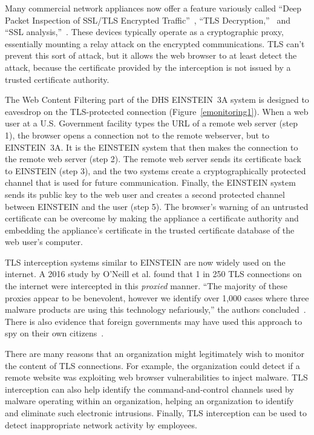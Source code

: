 \documentclass[fleqn,12pt]{wlscirep}
\begin{document}
Many commercial network appliances now offer a feature variously
called ``Deep Packet Inspection of SSL/TLS Encrypted
Traffic''~\cite{sonicwall}, ``TLS Decryption,''~\cite{paloalto} and
``SSL analysis,''~\cite{globalsign}. These devices typically operate
as a cryptographic proxy, essentially mounting a relay attack on the
encrypted communications. TLS can't prevent this sort of attack, but
it allows the web browser to at least detect the attack, because the
certificate provided by the interception is not issued by a trusted
certificate authority.

The Web Content Filtering part of the DHS EINSTEIN~3A system
is designed to eavesdrop on the TLS-protected connection 
(Figure~\ref{emonitoring1}). When a web user at a U.S. Government
facility types  the URL of a remote web server (step 1), the browser opens a
connection not to the remote webserver, but to EINSTEIN~3A. It is the
EINSTEIN system that then makes the connection to the remote web
server (step 2). The remote web server sends its certificate back to
EINSTEIN (step 3), and the two systems create a cryptographically
protected channel that is used for future communication.
Finally, the EINSTEIN system sends its public key to the web user and
creates a second protected channel between EINSTEIN and the user (step
5). The browser's warning of an untrusted certificate can be overcome
by making the appliance a certificate authority and embedding the
appliance's certificate in the trusted certificate database of the web 
user's computer.

TLS interception systems similar to EINSTEIN are now widely used on the internet.
A 2016 study by O'Neill et al. found that 1 in 250 TLS
connections on the internet were intercepted in this \emph{proxied} manner. ``The majority of these proxies appear to be benevolent,
however we identify over 1,000 cases where three malware
products are using this technology nefariously,'' the authors
concluded~\cite{DBLP:conf/imc/ONeillRSZ16}. There is also evidence
that foreign governments may have used this approach to spy on their
own citizens~\cite{fox-it-black-tulip}.

There are many reasons that an organization might legitimately wish to
monitor the content of TLS connections. For example, the organization
could detect if a remote website was exploiting web browser
vulnerabilities to inject malware. TLS interception can also help
identify the command-and-control channels used by malware operating
within an organization, helping an organization to identify and
eliminate such electronic intrusions. Finally, TLS interception can be
used to detect inappropriate network activity by employees.
\end{document}
